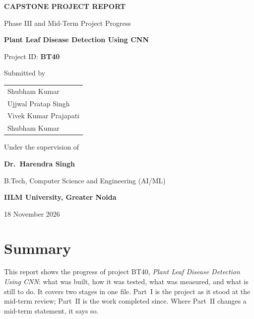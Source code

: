 \documentclass[12pt,a4paper]{report}
\newcommand{\ThesisTitle}{Plant Leaf Disease Detection Using CNN}
\newcommand{\ThesisAuthorA}{Shubham Kumar}
\newcommand{\ThesisAuthorB}{Ujjwal Pratap Singh}
\newcommand{\ThesisAuthorC}{Vivek Kumar Prajapati}
\newcommand{\ThesisAuthorD}{Shubham Kumar}
\newcommand{\ThesisProgramme}{B.Tech, Computer Science and Engineering (AI/ML)}
\newcommand{\ThesisInstitution}{IILM University, Greater Noida}
\newcommand{\ThesisGuide}{Dr.\ Harendra Singh}
\renewcommand{\ThesisTitle}{Plant Leaf Disease Detection Using CNN}
\begin{document}

\begin{titlepage}
\centering
\vspace*{1.2cm}

{\Large\bfseries CAPSTONE PROJECT REPORT\par}
{\large Phase III and Mid-Term Project Progress\par}

\vspace{1.6cm}
{\LARGE\bfseries \ThesisTitle\par}
\vspace{0.6cm}
{\large Project ID: \textbf{BT40}\par}

\vspace{1.8cm}
{\large Submitted by\par}
\vspace{0.5cm}
{\large
\begin{tabular}{@{}l@{}}
\ThesisAuthorA \\
\ThesisAuthorB \\
\ThesisAuthorC \\
\ThesisAuthorD \\
\end{tabular}\par}

\vspace{1.6cm}
{\large Under the supervision of\par}
{\large\bfseries \ThesisGuide\par}

\vspace{1.2cm}
{\large \ThesisProgramme\par}
{\large\bfseries \ThesisInstitution\par}

\vfill
{\large 18 November 2026\par}
\vspace{0.6cm}
\end{titlepage}

\chapter*{Summary}
\thispagestyle{plain}

This report shows the progress of project BT40, \emph{Plant Leaf Disease Detection
Using CNN}: what was built, how it was tested, what was measured, and what is still
to do. It covers two stages in one file. Part~I is the project as it stood at the
mid-term review; Part~II is the work completed since. Where Part~II changes a
mid-term statement, it says so.
\end{document}
